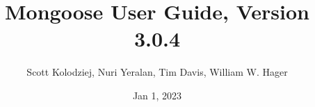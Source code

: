 \title{Mongoose User Guide, Version 3.0.4}
\author{Scott Kolodziej, Nuri Yeralan, Tim Davis, William W. Hager}
\date{Jan 1, 2023}
